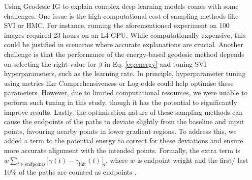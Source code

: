 Using Geodesic IG to explain complex deep learning models comes with some challenges. One issue is the high computational cost of sampling methods like SVI or HMC. For instance, running the aforementioned experiment on 100 images required 23 hours on an L4 GPU. While computationally expensive, this could be justified in scenarios where accurate explanations are crucial. Another challenge is that the performance of the energy-based geodesic method depends on selecting the right value for $\beta$ in Eq. \ref{eq:energy} and tuning SVI hyperparameters, such as the learning rate. In principle, hyperparameter tuning using metrics like Comprehensiveness or Log-odds could help optimise these parameters. However, due to limited computational resources, we were unable to perform such tuning in this study, though it has the potential to significantly improve results. Lastly, the optimisation nature of these sampling methods can cause the endpoints of the paths to deviate slightly from the baseline and input points, favouring nearby points in lower gradient regions. To address this, we added a term to the potential energy to correct for these deviations and ensure more accurate alignment with the intended points.  Formally, the extra term is $w \sum_{t \in \text{endpoints}} |\gamma(t) - \gamma_{\text{init}}(t)|_2$, where $w$ is endpoint weight and the first/ last 10\% of the paths are counted as endpoints .
